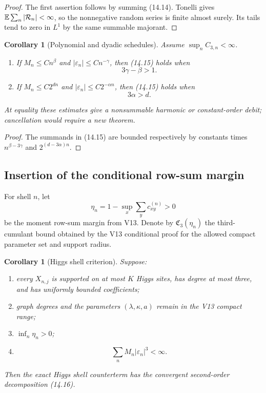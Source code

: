 \documentclass[11pt]{article}
\newtheorem{corollary}[theorem]{Corollary}
\theoremstyle{remark}
\begin{document}
\begin{proof}
The first assertion follows by summing (14.14).  Tonelli gives
\(\mathbb E\sum_n|{\cal R}_n|<\infty\), so the nonnegative random
series is finite almost surely.  Its tails tend to zero in \(L^1\)
by the same summable majorant.
\end{proof}

\begin{corollary}[Polynomial and dyadic schedules]
\label{cor:v17v14-rates}
Assume \(\sup_nC_{3,n}<\infty\).
\begin{enumerate}
\item If \(M_n\leq Cn^\beta\) and
      \(|\varepsilon_n|\leq Cn^{-\gamma}\), then (14.15) holds when
      \[
      3\gamma-\beta>1.                             \tag{14.17}
      \]
\item If \(M_n\leq C2^{dn}\) and
      \(|\varepsilon_n|\leq C2^{-\alpha n}\), then (14.15) holds
      when
      \[
      3\alpha>d.                                   \tag{14.18}
      \]
\end{enumerate}
At equality these estimates give a nonsummable harmonic or
constant-order debit; cancellation would require a new theorem.
\end{corollary}

\begin{proof}
The summands in (14.15) are bounded respectively by constants times
\(n^{\beta-3\gamma}\) and \(2^{(d-3\alpha)n}\).
\end{proof}

\subsection{Insertion of the conditional row-sum margin}

For shell \(n\), let
\[
 \eta_n
 =1-\sup_x\sum_yc_{xy}^{(n)}>0                     \tag{14.19}
\]
be the moment row-sum margin from V13.  Denote by
\({\mathfrak C}_3(\eta_n)\) the third-cumulant bound obtained by
the V13 conditional proof for the allowed compact parameter set and
support radius.

\begin{corollary}[Higgs shell criterion]
\label{cor:v17v14-higgs}
Suppose:
\begin{enumerate}
\item every \(X_{n,j}\) is supported on at most \(K\) Higgs sites,
      has degree at most three, and has uniformly bounded
      coefficients;
\item graph degrees and the parameters
      \((\lambda,\kappa,a)\) remain in the V13 compact range;
\item \(\inf_n\eta_n>0\);
\item
      \[
      \sum_nM_n|\varepsilon_n|^3<\infty.           \tag{14.20}
      \]
\end{enumerate}
Then the exact Higgs shell counterterm has the convergent
second-order decomposition (14.16).
\end{corollary}
\end{document}
